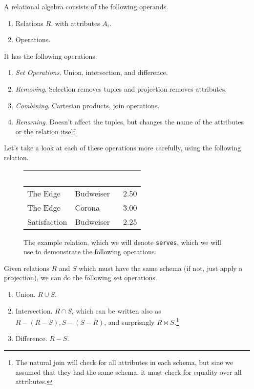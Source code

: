 \documentclass{article}
\begin{document}
    \begin{definition}
      A relational algebra consists of the following operands. 
      \begin{enumerate}
        \item Relations $R$, with attributes $A_i$. 
        \item Operations. 
      \end{enumerate}
      It has the following operations. 
      \begin{enumerate}
        \item \textit{Set Operations}. Union, intersection, and difference. 
        \item \textit{Removing}. Selection removes tuples and projection removes attributes. 
        \item \textit{Combining}. Cartesian products, join operations. 
        \item \textit{Renaming}. Doesn't affect the tuples, but changes the name of the attributes or the relation itself. 
      \end{enumerate}
    \end{definition}

    Let's take a look at each of these operations more carefully, using the following relation. 

    \begin{figure}[H]
      \centering
      \begin{tabular}{|l|l|r|}
      \hline
      \rowcolor[HTML]{E26B0A} 
      \textcolor{white}{\textbf{bar}} & \textcolor{white}{\textbf{beer}} & \textcolor{white}{\textbf{price}} \\ \hline
      \rowcolor[HTML]{FBCEB1}
      The Edge & Budweiser & 2.50 \\ \hline
      \rowcolor[HTML]{FBCEB1}
      The Edge & Corona & 3.00 \\ \hline
      \rowcolor[HTML]{FBCEB1}
      Satisfaction & Budweiser & 2.25 \\ \hline
      \end{tabular}
      \caption{The example relation, which we will denote \texttt{serves}, which we will use to demonstrate the following operations.} 
      \label{fig:serves}
    \end{figure}
    
    \begin{definition}
      Given relations $R$ and $S$ which must have the same schema (if not, just apply a projection), we can do the following set operations. 
      \begin{enumerate}
        \item Union. $R \cup S$. 
        \item Intersection. $R \cap S$, which can be written also as $R - (R - S), S - (S - R)$, and surprisngly $R \bowtie S$.\footnote{The natural join will check for all attributes in each schema, but sine we assumed that they had the same schema, it must check for equality over all attributes.}
        \item Difference. $R - S$. 
      \end{enumerate}
    \end{definition}
\end{document}
